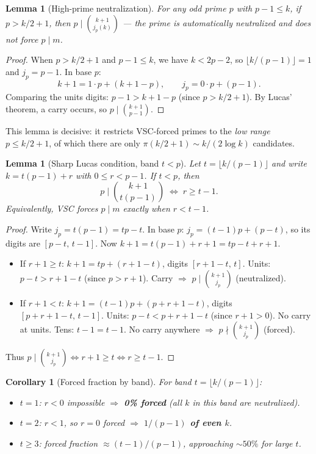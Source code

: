 \documentclass[12pt,a4paper]{article}
\theoremstyle{plain}
\newtheorem{lemma}[theorem]{Lemma}
\newtheorem{corollary}[theorem]{Corollary}
\theoremstyle{definition}
\begin{document}
\begin{lemma}[High-prime neutralization]\label{lem:high-neutral}
  For any odd prime $p$ with $p-1 \le k$, if $p > k/2 + 1$, then
  $p \mid \binom{k+1}{j_p(k)}$ --- the prime is automatically
  neutralized and does \emph{not} force $p \mid m$.
\end{lemma}

\begin{proof}
  When $p > k/2 + 1$ and $p-1 \le k$, we have $k < 2p-2$, so
  $\lfloor k/(p-1)\rfloor = 1$ and $j_p = p-1$.  In base $p$:
  \[
    k+1 = 1\cdot p + (k+1-p),\qquad
    j_p = 0\cdot p + (p-1).
  \]
  Comparing the units digits: $p-1 > k+1-p$ (since $p > k/2+1$).
  By Lucas' theorem, a carry occurs, so $p \mid \binom{k+1}{p-1}$.
\end{proof}

This lemma is decisive: it restricts VSC-forced primes to the
\emph{low range} $p \le k/2 + 1$, of which there are only
$\pi(k/2+1) \sim k/(2\log k)$ candidates.

\begin{lemma}[Sharp Lucas condition, band $t < p$]\label{lem:sharp-lucas}
  Let $t = \lfloor k/(p-1)\rfloor$ and write
  $k = t(p-1) + r$ with $0 \le r < p-1$.  If $t < p$, then
  \[\label{eq:sharp-lucas}
    p \mid \binom{k+1}{t(p-1)} \; \Longleftrightarrow \; r \ge t-1.
  \]
  Equivalently, VSC forces $p \mid m$ exactly when $r < t-1$.
\end{lemma}

\begin{proof}
  Write $j_p = t(p-1) = tp - t$.  In base $p$:
  $j_p = (t-1)p + (p-t)$, so its digits are $[p-t,\, t-1]$.
  Now $k+1 = t(p-1) + r + 1 = tp - t + r + 1$.
  \begin{itemize}[nosep]
    \item If $r+1 \ge t$: $k+1 = tp + (r+1-t)$, digits $[r+1-t,\, t]$.
      Units: $p-t > r+1-t$ (since $p > r+1$).  Carry $\Rightarrow$
      $p \mid \binom{k+1}{j_p}$ (neutralized).
    \item If $r+1 < t$: $k+1 = (t-1)p + (p+r+1-t)$,
      digits $[p+r+1-t,\, t-1]$.  Units: $p-t < p+r+1-t$ (since $r+1>0$).
      No carry at units.  Tens: $t-1 = t-1$.  No carry anywhere
      $\Rightarrow$ $p \nmid \binom{k+1}{j_p}$ (forced).
  \end{itemize}
  Thus $p \mid \binom{k+1}{j_p} \iff r+1 \ge t \iff r \ge t-1$.
\end{proof}

\begin{corollary}[Forced fraction by band]\label{cor:forced-fraction}
  For band $t = \lfloor k/(p-1)\rfloor$:
  \begin{itemize}[nosep]
    \item $t = 1$: $r < 0$ impossible $\Rightarrow$ \textbf{0\% forced}
      (all $k$ in this band are neutralized).
    \item $t = 2$: $r < 1$, so $r = 0$ forced $\Rightarrow$
      \textbf{$1/(p-1)$ of even $k$}.
    \item $t \ge 3$: forced fraction $\approx (t-1)/(p-1)$, approaching
      $\sim 50\%$ for large $t$.
  \end{itemize}
\end{corollary}
\end{document}

